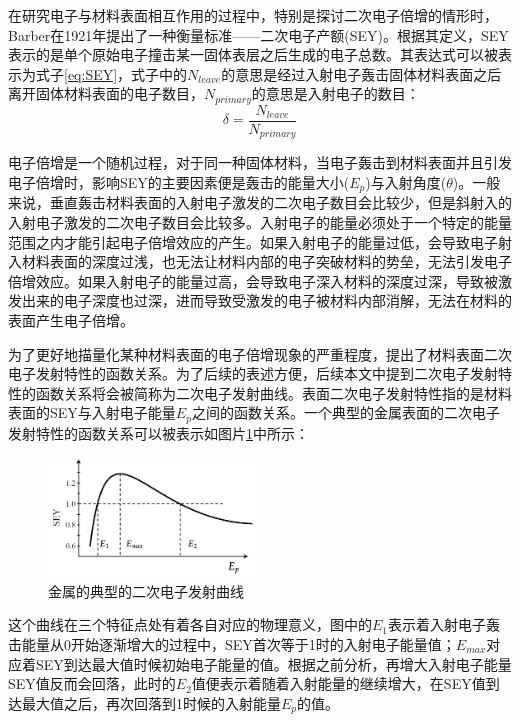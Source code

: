 \documentclass[master]{thesis-uestc}
\begin{document}
在研究电子与材料表面相互作用的过程中，特别是探讨二次电子倍增的情形时，Barber在1921年提出了一种衡量标准——二次电子产额(SEY)。根据其定义，SEY表示的是单个原始电子撞击某一固体表层之后生成的电子总数。其表达式可以被表示为式子\ref{eq:SEY}，式子中的$N_{leave}$的意思是经过入射电子轰击固体材料表面之后离开固体材料表面的电子数目，$N_{primary}$的意思是入射电子的数目：
\begin{equation}\label{eq:SEY}
    \delta = \frac{N_{leave}}{N_{primary}}
\end{equation}

电子倍增是一个随机过程，对于同一种固体材料，当电子轰击到材料表面并且引发电子倍增时，影响SEY的主要因素便是轰击的能量大小($E_p$)与入射角度($\theta$)。一般来说，垂直轰击材料表面的入射电子激发的二次电子数目会比较少，但是斜射入的入射电子激发的二次电子数目会比较多。入射电子的能量必须处于一个特定的能量范围之内才能引起电子倍增效应的产生。如果入射电子的能量过低，会导致电子射入材料表面的深度过浅，也无法让材料内部的电子突破材料的势垒，无法引发电子倍增效应。如果入射电子的能量过高，会导致电子深入材料的深度过深，导致被激发出来的电子深度也过深，进而导致受激发的电子被材料内部消解，无法在材料的表面产生电子倍增。

为了更好地描量化某种材料表面的电子倍增现象的严重程度，提出了材料表面二次电子发射特性的函数关系。为了后续的表述方便，后续本文中提到二次电子发射特性的函数关系将会被简称为二次电子发射曲线。表面二次电子发射特性指的是材料表面的SEY与入射电子能量$E_p$之间的函数关系。一个典型的金属表面的二次电子发射特性的函数关系可以被表示如图片\ref{fig:SEY_EP}中所示：
\begin{figure}[!htb]
    \centering
    \includegraphics[width=0.5\textwidth]{pic/chapter2/二次电子发射曲线.png}
    \caption{金属的典型的二次电子发射曲线}
    \label{fig:SEY_EP}
\end{figure}

这个曲线在三个特征点处有着各自对应的物理意义，图中的$E_1$表示着入射电子轰击能量从0开始逐渐增大的过程中，SEY首次等于1时的入射电子能量值；$E_{max}$对应着SEY到达最大值时候初始电子能量的值。根据之前分析，再增大入射电子能量SEY值反而会回落，此时的$E_2$值便表示着随着入射能量的继续增大，在SEY值到达最大值之后，再次回落到1时候的入射能量$E_p$的值。
\end{document}

